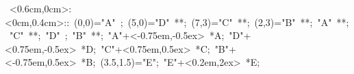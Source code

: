 

\hbox{
\xy    <0.6cm,0cm>:<0cm,0.4cm>::
       (0,0)="A" ; (5,0)="D" **\dir{-}; 
       (7,3)="C" **\dir{-}; (2,3)="B" **\dir{-}; 
       "A" **\dir{-};
       "C" **\dir{-}; "D" ; "B" **\dir{-};
       "A"+<-0.75em,-0.5ex> *{A};
       "D"+<0.75em,-0.5ex> *{D};
       "C"+<0.75em,0.5ex> *{C};
       "B"+<-0.75em,0.5ex> *{B};  
       (3.5,1.5)="E"; "E"+<0.2em,2ex> *{E};
     \endxy}
	   
